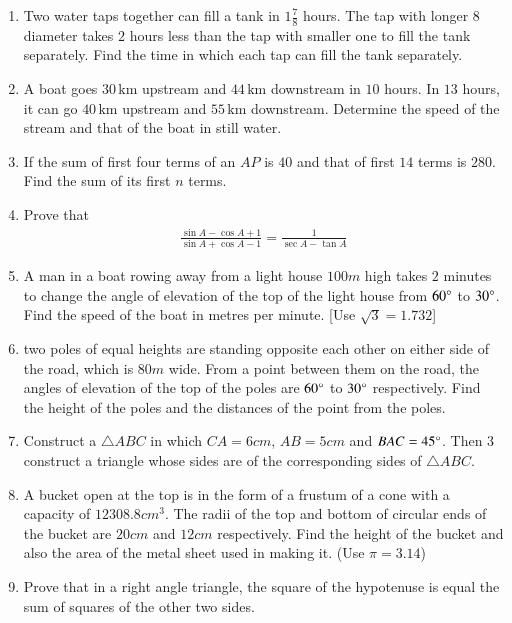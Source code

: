 \documentclass[12pt,-letter paper]{article}
\begin{document}
\begin{enumerate}
\item Two water taps together can fill a tank in $1\frac{7}{8}$ hours. The tap with longer $8$ diameter takes $2$ hours less than the tap with smaller one to fill the tank separately. Find the time in which each tap can fill the tank separately.
\item A boat goes $30 \,\text{km}$ upstream and $44 \,\text{km}$ downstream in $10$ hours. In $13$ hours, it can go $40\,\text{km}$ upstream and $55 \,\text{km}$ downstream. Determine the speed of the stream and that of the boat in still water.
\item If the sum of first four terms of an $AP$ is $40$ and that of first $14$ terms is $280$. Find the sum of its first $n$ terms.
\item Prove that \begin{align*} \frac{\sin A-\cos A+1}{\sin A+ \cos A-1}  =\frac{1}{\sec A-\tan A}\end{align*}
\item A man in a boat rowing away from a light house $100 m$ high takes $2$ minutes to change the angle of elevation of the top of the light house from $60\degree$ to $30\degree$. Find the speed of the boat in metres per minute. [Use $\sqrt{3}=1.732$]
\item two poles of equal heights are standing opposite each other on either side of the road, which is $80 m$ wide. From a point between them on the road, the angles of elevation of the top of the poles are $60\degree$ to $30\degree$ respectively. Find the height of the poles and the distances of the point from the poles.
\item Construct a $\triangle ABC$ in which $CA = 6 cm$, $AB = 5 cm$ and $BAC= 45\degree$. Then $3$ construct a triangle whose sides are of the corresponding sides of $\triangle ABC$.
\item A bucket open at the top is in the form of a frustum of a cone with a capacity of $12308.8 cm^3$. The radii of the top and bottom of circular ends of the bucket are $20 cm$ and $12 cm$ respectively. Find the height of the bucket and also the area of the metal sheet used in making it. (Use  $\pi= 3.14$)
\item Prove that in a right angle triangle, the square of the hypotenuse is equal the sum of squares of the other two sides.

\end{enumerate}
\end{document}
